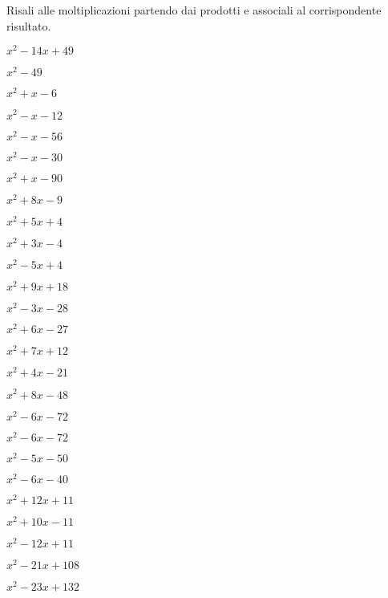 \begin{esercizio}
\label{ese:11.11}
Risali alle moltiplicazioni partendo dai prodotti e associali al 
corrispondente risultato.

\begin{htmulticols}{4}
\begin{enumeratea}
\spazielenx
\item \(x^{2} - 14 x + 49\) %
\item \(x^{2} - 49\) %
\item \(x^{2} + x - 6\) %
\item \(x^{2} - x - 12\) %
\item \(x^{2} - x - 56\) %
\item \(x^{2} - x - 30\) %
\item \(x^{2} + x - 90\) %
\item \(x^{2} + 8 x - 9\) %
\item \(x^{2} + 5 x + 4\) %
\item \(x^{2} + 3 x - 4\) %
\item \(x^{2} - 5 x + 4\) %
\item \(x^{2} + 9 x + 18\) %
\item \(x^{2} - 3 x - 28\) %
\item \(x^{2} + 6 x - 27\) %
\item \(x^{2} + 7 x + 12\) %
\item \(x^{2} + 4 x - 21\) %
\item \(x^{2} + 8 x - 48\) %
\item \(x^{2} - 6 x - 72\) %
\item \(x^{2} - 6 x - 72\) %
\item \(x^{2} - 5 x - 50\) %
\item \(x^{2} - 6 x - 40\) %
\item \(x^{2} + 12 x + 11\) %
\item \(x^{2} + 10 x - 11\) %
\item \(x^{2} - 12 x + 11\) %
\item \(x^{2} - 21 x + 108\) %
\item \(x^{2} - 23 x + 132\) %


\end{enumeratea}
\end{htmulticols}
\end{esercizio}
